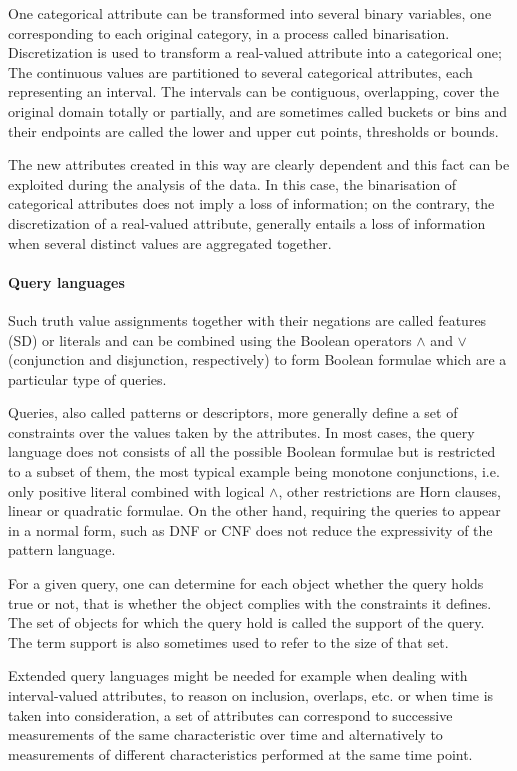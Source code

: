 \documentclass[a4paper,10pt]{article}
\begin{document}
One categorical attribute can be transformed into several binary
variables, one corresponding to each original category, in a process
called binarisation.  Discretization is used to transform a
real-valued attribute into a categorical one; The continuous values
are partitioned to several categorical attributes, each representing
an interval. The intervals can be contiguous, overlapping, cover the
original domain totally or partially, and are sometimes called buckets
or bins and their endpoints are called the lower and upper cut points,
thresholds or bounds.

The new attributes created in this way are clearly dependent and this
fact can be exploited during the analysis of the data. In this
case, the binarisation of categorical attributes does not imply a loss
of information; on the contrary, the discretization of a real-valued
attribute, generally entails a loss of information when several
distinct values are aggregated together.

\paragraph{Query languages}
Such truth value assignments together with their negations are called
features (SD) or literals and can be combined using the Boolean
operators $\land$ and $\lor$ (conjunction and disjunction,
respectively) to form Boolean formulae which are a particular type of
queries.

Queries, also called patterns or descriptors, more generally define a
set of constraints over the values taken by the attributes.  In most
cases, the query language does not consists of all the possible
Boolean formulae but is restricted to a subset of them, the most
typical example being monotone conjunctions, i.e. only positive
literal combined with logical $\land$, other restrictions are Horn
clauses, linear or quadratic formulae.  
On the other hand, requiring
the queries to appear in a normal form, such as DNF or CNF does not
reduce the expressivity of the pattern language.

For a given query, one can determine for each object whether the query
holds true or not, that is whether the object complies with the
constraints it defines.  The set of objects for which the query hold
is called the support of the query. The term support is also sometimes
used to refer to the size of that set.

Extended query languages might be needed for example when dealing with
interval-valued attributes, to reason on inclusion, overlaps, etc. or
when time is taken into consideration, a set of attributes can
correspond to successive measurements of the same characteristic over
time and alternatively to measurements of different characteristics
performed at the same time point.
\end{document}
